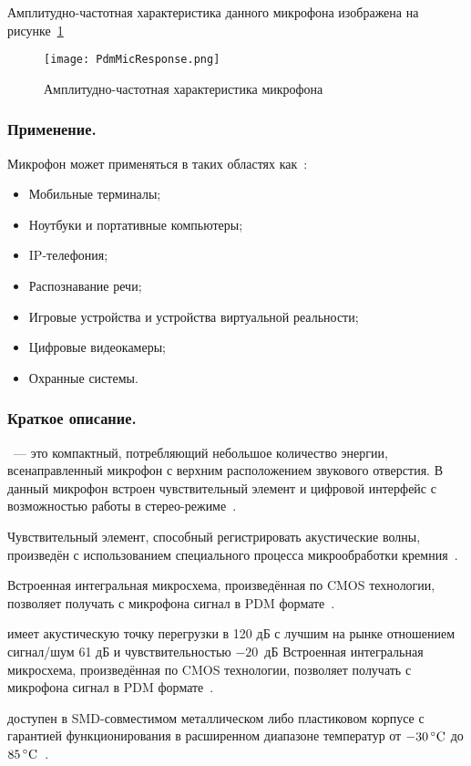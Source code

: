 Амплитудно-частотная характеристика данного микрофона изображена на рисунке~\ref{fig:PdmMicResponse}

\begin{figure}[ht]
	\centering
	\texttt{[image: PdmMicResponse.png]}  
	\caption{Амплитудно-частотная характеристика микрофона \micname{}}
	\label{fig:PdmMicResponse}
\end{figure}

\subsubsection{Применение. }
Микрофон \micname{} может применяться в таких областях как~\cite{ST_MP45DT02}:
\begin{itemize}
	\item Мобильные терминалы;
	\item Ноутбуки и портативные компьютеры;
	\item IP-телефония;
	\item Распознавание речи;
	\item Игровые устройства и устройства виртуальной реальности;
	\item Цифровые видеокамеры;
	\item Охранные системы.
\end{itemize}

\subsubsection{Краткое описание. }
\micname{}~--- это компактный, потребляющий небольшое количество энергии, всенаправленный микрофон с верхним расположением звукового отверстия. В данный микрофон встроен чувствительный элемент и цифровой интерфейс с возможностью работы в стерео-режиме~\cite{ST_MP45DT02}.

Чувствительный элемент, способный регистрировать акустические волны, произведён с использованием специального процесса микрообработки кремния~\cite{ST_MP45DT02}.

Встроенная интегральная микросхема, произведённая по CMOS технологии, позволяет получать с микрофона сигнал в PDM формате~\cite{ST_MP45DT02}.

\micname{} имеет акустическую точку перегрузки в 120 дБ с лучшим на рынке отношением сигнал/шум 61 дБ и чувствительностью $-20$~дБ
Встроенная интегральная микросхема, произведённая по CMOS технологии, позволяет получать с микрофона сигнал в PDM формате~\cite{ST_MP45DT02}.

\micname{} доступен в SMD-совместимом металлическом либо пластиковом корпусе с гарантией функционирования в расширенном диапазоне температур от $-30\,^{\circ}{\rm C}$ до $85\,^{\circ}{\rm C}$~\cite{ST_MP45DT02}.

